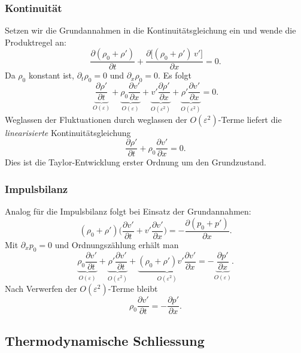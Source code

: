 \subsubsection{Kontinuität}
Setzen wir die Grundannahmen in die Kontinuitätsgleichung ein und
%
wende die Produktregel an:
\[
    \frac{\partial(\rho_0+\rho')}{\partial t}
    +\frac{\partial\big[(\rho_0+\rho')\,v'\big]}{\partial x}=0.
\]
Da \(\rho_0\) konstant ist, \(\partial_t\rho_0=0\) und \(\partial_x\rho_0=0\).
Es folgt
\[
    \underbrace{\frac{\partial \rho'}{\partial t}}_{\displaystyle O(\varepsilon)}
    +\underbrace{\rho_0\frac{\partial v'}{\partial x}}_{\displaystyle O(\varepsilon)}
    +\underbrace{v'\frac{\partial \rho'}{\partial x}}_{\displaystyle O(\varepsilon^2)}
    +\underbrace{\rho'\frac{\partial v'}{\partial x}}_{\displaystyle O(\varepsilon^2)}=0.
\]
Weglassen der Fluktuationen durch weglassen der \(O(\varepsilon^2)\)-Terme
liefert die \emph{linearisierte} Kontinuitätsgleichung
\begin{equation}
    \frac{\partial \rho'}{\partial t}+\rho_0\frac{\partial v'}{\partial x}=0.
    \label{eq:lin-cont}
\end{equation}
Dies ist die Taylor-Entwicklung erster Ordnung um den Grundzustand.

\subsubsection{Impulsbilanz}
Analog für die Impulsbilanz folgt bei Einsatz der Grundannahmen:
\[
    (\rho_0+\rho')\biggl(\frac{\partial v'}{\partial t}+v'\frac{\partial v'}{\partial x}\biggr)
    =-\frac{\partial (p_0+p')}{\partial x}.
\]
Mit \(\partial_x p_0=0\) und Ordnungszählung erhält man
\[
    \underbrace{\rho_0\frac{\partial v'}{\partial t}}_{\displaystyle O(\varepsilon)}
    +\underbrace{\rho'\frac{\partial v'}{\partial t}}_{\displaystyle O(\varepsilon^2)}
    +\underbrace{(\rho_0+\rho')v'\frac{\partial v'}{\partial x}}_{\displaystyle O(\varepsilon^2)}
    =-\underbrace{\frac{\partial p'}{\partial x}}_{\displaystyle O(\varepsilon)}.
\]
Nach Verwerfen der \(O(\varepsilon^2)\)-Terme bleibt
\begin{equation}
    \rho_0\frac{\partial v'}{\partial t}=-\frac{\partial p'}{\partial x}.
    \label{eq:lin-mom}
\end{equation}

\subsection{Thermodynamische Schliessung}

